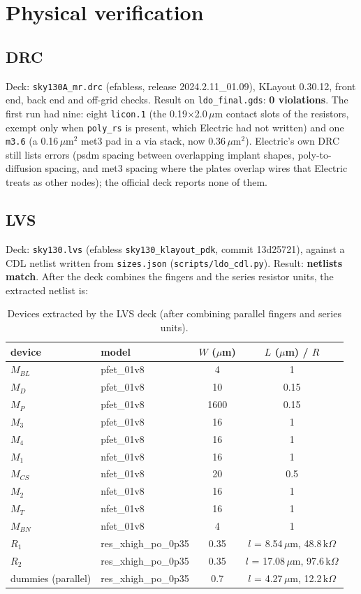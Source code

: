 \documentclass[10pt,a4paper]{article}
\begin{document}
\section{Physical verification}

\subsection{DRC}
Deck: \texttt{sky130A\_mr.drc} (efabless, release 2024.2.11\_01.09), KLayout 0.30.12, front end, back end and off-grid checks. Result on \texttt{ldo\_final.gds}: \textbf{0 violations}. The first run had nine: eight \texttt{licon.1} (the 0.19$\times$2.0\,$\mu$m contact slots of the resistors, exempt only when \texttt{poly\_rs} is present, which Electric had not written) and one \texttt{m3.6} (a 0.16\,$\mu$m$^2$ met3 pad in a via stack, now 0.36\,$\mu$m$^2$). Electric's own DRC still lists errors (psdm spacing between overlapping implant shapes, poly-to-diffusion spacing, and met3 spacing where the plates overlap wires that Electric treats as other nodes); the official deck reports none of them.

\subsection{LVS}
Deck: \texttt{sky130.lvs} (efabless \texttt{sky130\_klayout\_pdk}, commit 13d25721), against a CDL netlist written from \texttt{sizes.json} (\texttt{scripts/ldo\_cdl.py}). Result: \textbf{netlists match}. After the deck combines the fingers and the series resistor units, the extracted netlist is:

\begin{table}[H]
\centering\small
\caption{Devices extracted by the LVS deck (after combining parallel fingers and series units).}
\begin{tabular}{llcc}
\toprule
device & model & $W$ ($\mu$m) & $L$ ($\mu$m) / $R$ \\
\midrule
$M_{BL}$ & pfet\_01v8 & 4 & 1 \\
$M_D$ & pfet\_01v8 & 10 & 0.15 \\
$M_P$ & pfet\_01v8 & 1600 & 0.15 \\
$M_3$ & pfet\_01v8 & 16 & 1 \\
$M_4$ & pfet\_01v8 & 16 & 1 \\
$M_1$ & nfet\_01v8 & 16 & 1 \\
$M_{CS}$ & nfet\_01v8 & 20 & 0.5 \\
$M_2$ & nfet\_01v8 & 16 & 1 \\
$M_T$ & nfet\_01v8 & 16 & 1 \\
$M_{BN}$ & nfet\_01v8 & 4 & 1 \\
$R_1$ & res\_xhigh\_po\_0p35 & 0.35 & $l$ = 8.54\,$\mu$m, 48.8\,k$\Omega$ \\
$R_2$ & res\_xhigh\_po\_0p35 & 0.35 & $l$ = 17.08\,$\mu$m, 97.6\,k$\Omega$ \\
dummies (parallel) & res\_xhigh\_po\_0p35 & 0.7 & $l$ = 4.27\,$\mu$m, 12.2\,k$\Omega$ \\
\bottomrule
\end{tabular}
\end{table}
\end{document}
